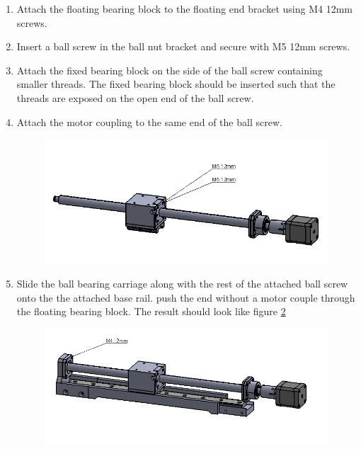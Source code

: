 \begin{enumerate}
\item Attach the floating bearing block to the floating end bracket using M4 12mm screws.

\item Insert a ball screw in the ball nut bracket and secure with M5 12mm screws.

\item Attach the fixed bearing block on the side of the ball screw containing smaller threads. The fixed bearing block should be inserted such that the threads are exposed on the open end of the ball screw.

\item Attach the motor coupling to the same end of the ball screw.

\begin{figure}
    \centering
    \includegraphics[scale=0.5]{Platforms/figs/xaxis4.png}
    \caption{\label{fig:xaxis4}}
\end{figure}

\item Slide the ball bearing carriage along with the rest of the attached ball screw onto the the attached base rail. push the end without a motor couple through the floating bearing block. The result should look like figure \ref{fig:xaxis5} 

\begin{figure}
    \centering
    \includegraphics[scale=0.4]{Platforms/figs/xaxis5.png}
    \caption{\label{fig:xaxis5}}
\end{figure}


\end{enumerate}
